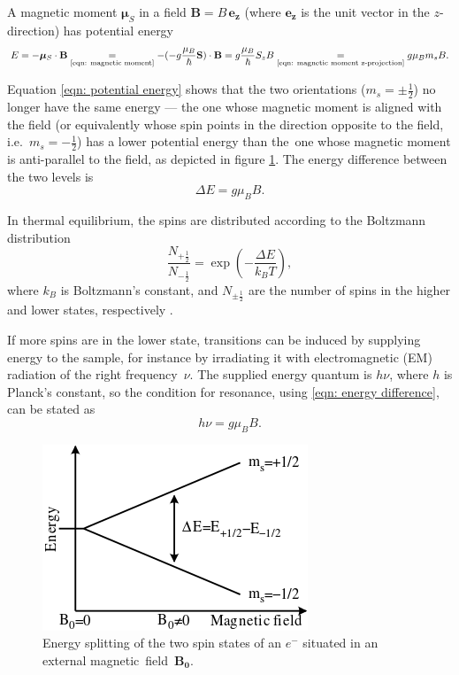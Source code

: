 \documentclass[a4paper]{jpconf}
\numberwithin{equation}{section}
\begin{document}
A magnetic moment $\bm{\mu}_S$ in a field $\mathbf{B} = B \, \mathbf{e_z}$ (where $\mathbf{e_z}$ is the unit vector in the $z$-direction) has potential energy
\begin{equation}
	E = - \bm{\mu}_S \cdot \mathbf{B} \underset{\text{\eqref{eqn: magnetic moment}}}{=}  - (- g \frac{\mu_B}{\hbar} \mathbf{S})\cdot\mathbf{B}
	  = g \frac{\mu_B}{\hbar}S_z B 
	  \underset{\text{\eqref{eqn: magnetic moment z-projection}}}{=} g\mu_Bm_sB \label{eqn: potential energy}.
\end{equation}

Equation \eqref{eqn: potential energy} shows that the two orientations ($m_s = \pm\tfrac12$) no longer have the same energy --- the one whose magnetic moment is aligned with the field (or equivalently whose spin points in the direction opposite to the field, i.e.\ $m_s = -\tfrac12$) has a lower potential energy than the~one whose magnetic moment is anti-parallel to the field, as depicted in figure \ref{fig: energy splitting}. The energy difference between the two levels is 
\begin{equation}
	\Delta E = g \mu_B B. \label{eqn: energy difference}
\end{equation}

In thermal equilibrium, the spins are distributed according to the Boltzmann distribution
\[
    \frac{N_{+\tfrac12}}{N_{-\tfrac12}} = \exp(- \frac{\Delta E}{k_B T}),
\]
where $k_B$ is Boltzmann\textquoteright s constant, and $N_{\pm\tfrac12}$ are the number of spins in the higher and lower states, respectively \cite{Gero}. 

If more spins are in the lower state, transitions can be induced by supplying energy to the sample, for instance by irradiating it with electromagnetic (EM) radiation of the right frequency~$\nu$. The supplied energy quantum is $h \nu$, where $h$ is Planck's constant, so the condition for resonance, using \eqref{eqn: energy difference}, can be stated as
\begin{equation}
	h\nu = g\mu_B B. \label{eqn: resonance condition}
\end{equation}

\begin{figure}[t!]
	\includegraphics[scale=0.75]{EPR_splitting.png}
	\hspace{2pc}
	\begin{minipage}[b]{3in}
		\caption{Energy splitting of the two spin states of an $e^-$ situated in an external magnetic~field~$\mathbf{B_0}$.}
		\label{fig: energy splitting}
	\end{minipage}
\end{figure}
\end{document}
